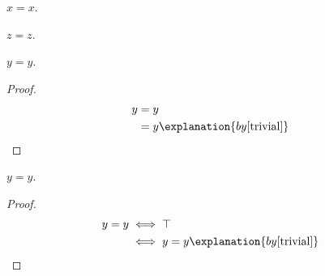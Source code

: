 \begin{proposition}\label{trivial}
    $x = x$.
\end{proposition}

\begin{proposition}\label{irrelevant}
    $z = z$.
\end{proposition}

\begin{proposition}\label{alsotrivial}
    $y = y$.
\end{proposition}
\begin{proof}
    \begin{align*}
        y
            &= y
                \\
            &= y
                \explanation{by \cref{trivial}}
    \end{align*}
\end{proof}

\begin{proposition}\label{trivial_biconditionals}
    $y = y$.
\end{proposition}
\begin{proof}
    \begin{align*}
        y = y
            &\iff \top
                \\
            &\iff y = y
                \explanation{by \cref{trivial}}
    \end{align*}
\end{proof}
